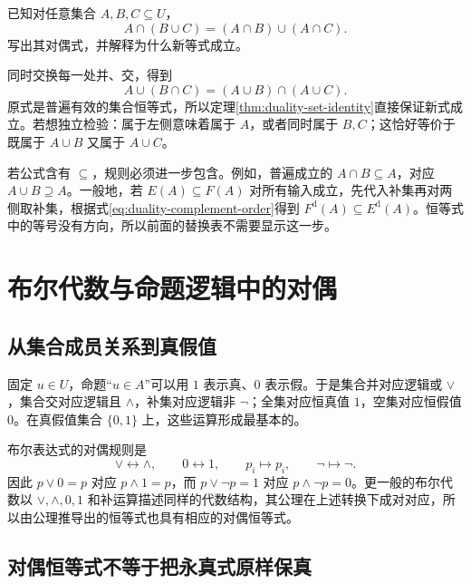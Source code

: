 \documentclass[UTF8]{ctexart}
\begin{document}
\begin{example}[分配律的配对]
已知对任意集合 $A,B,C\subseteq U$，
\[
 A\cap(B\cup C)=(A\cap B)\cup(A\cap C).
\]
写出其对偶式，并解释为什么新等式成立。
\end{example}
\begin{solve}
同时交换每一处并、交，得到
\[
 A\cup(B\cap C)=(A\cup B)\cap(A\cup C).
\]
原式是普遍有效的集合恒等式，所以定理\ref{thm:duality-set-identity}直接保证新式成立。若想独立检验：属于左侧意味着属于 $A$，或者同时属于 $B,C$；这恰好等价于既属于 $A\cup B$ 又属于 $A\cup C$。
\end{solve}

若公式含有 $\subseteq$，规则必须进一步包含。例如，普遍成立的 $A\cap B\subseteq A$，对应 $A\cup B\supseteq A$。一般地，若 $E(A)\subseteq F(A)$ 对所有输入成立，先代入补集再对两侧取补集，根据式\eqref{eq:duality-complement-order}得到 $F^{\mathrm d}(A)\subseteq E^{\mathrm d}(A)$。恒等式中的等号没有方向，所以前面的替换表不需要显示这一步。

\section{布尔代数与命题逻辑中的对偶}
\label{sec:duality-boolean}

\subsection{从集合成员关系到真假值}

固定 $u\in U$，命题“$u\in A$”可以用 $1$ 表示真、$0$ 表示假。于是集合并对应逻辑或 $\lor$，集合交对应逻辑且 $\land$，补集对应逻辑非 $\neg$；全集对应恒真值 $1$，空集对应恒假值 $0$。在真假值集合 $\{0,1\}$ 上，这些运算形成最基本的。

布尔表达式的对偶规则是
\begin{equation}
 \lor\longleftrightarrow\land,
 \qquad 0\longleftrightarrow1,
 \qquad p_i\longmapsto p_i,
 \qquad\neg\longmapsto\neg.
 \label{eq:duality-boolean-rule}
\end{equation}
因此 $p\lor0=p$ 对应 $p\land1=p$，而 $p\lor\neg p=1$ 对应 $p\land\neg p=0$。更一般的布尔代数以 $\vee,\wedge,0,1$ 和补运算描述同样的代数结构，其公理在上述转换下成对对应，所以由公理推导出的恒等式也具有相应的对偶恒等式。

\subsection{对偶恒等式不等于把永真式原样保真}
\end{document}
